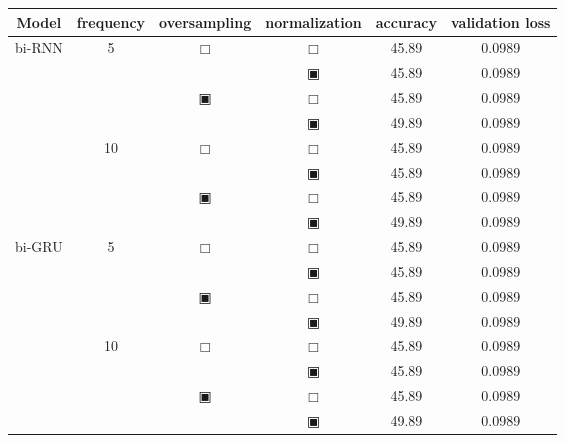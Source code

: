 \begin{table}[H]
	\renewcommand{\arraystretch}{.68}
	\begin{tabular}{|c|c|c|c|c|c|}
		\hline
		Model & frequency & oversampling & normalization & accuracy & validation loss\\
		\hline\hline
		\multirow{8}{*}{bi-RNN}& \multirow{4}{*}{5} & \multirow{2}{*}{$\Box$} & $\Box$ & 45.89 & 0.0989\\\cline{4-6}
				    &                    &                         & $\blackinwhitesquare$ & 45.89 & 0.0989\\\cline{3-6}
				    &                    & \multirow{2}{*}{$\blackinwhitesquare$} & $\Box$ & 45.89 & 0.0989\\\cline{4-6}
				    &                    &                         & $\blackinwhitesquare$ & 49.89 & 0.0989\\\cline{2-6}
				    & \multirow{4}{*}{10} & \multirow{2}{*}{$\Box$} & $\Box$ & 45.89 & 0.0989\\\cline{4-6}
				    &                     &                         & $\blackinwhitesquare$ & 45.89 & 0.0989\\\cline{3-6}
				    &                     & \multirow{2}{*}{$\blackinwhitesquare$} & $\Box$ & 45.89 & 0.0989\\\cline{4-6}
				    &                     &                         & $\blackinwhitesquare$ & 49.89 & 0.0989\\\cline{2-6}
		\hline\hline
		\multirow{8}{*}{bi-GRU}& \multirow{4}{*}{5} & \multirow{2}{*}{$\Box$} & $\Box$ & 45.89 & 0.0989\\\cline{4-6}
				    &                    &                         & $\blackinwhitesquare$ & 45.89 & 0.0989\\\cline{3-6}
				    &                    & \multirow{2}{*}{$\blackinwhitesquare$} & $\Box$ & 45.89 & 0.0989\\\cline{4-6}
				    &                    &                         & $\blackinwhitesquare$ & 49.89 & 0.0989\\\cline{2-6}
				    & \multirow{4}{*}{10} & \multirow{2}{*}{$\Box$} & $\Box$ & 45.89 & 0.0989\\\cline{4-6}
				    &                     &                         & $\blackinwhitesquare$ & 45.89 & 0.0989\\\cline{3-6}
				    &                     & \multirow{2}{*}{$\blackinwhitesquare$} & $\Box$ & 45.89 & 0.0989\\\cline{4-6}
				    &                     &                         & $\blackinwhitesquare$ & 49.89 & 0.0989\\\cline{2-6}

\end{tabular}
\end{table}
